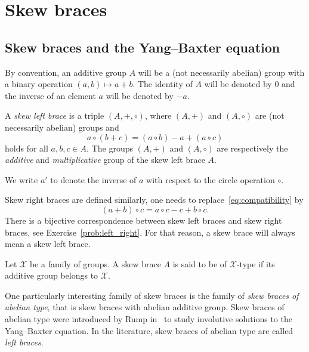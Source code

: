 \chapter{Skew braces}
\label{braces}

\section*{Skew braces and the Yang--Baxter equation}

By convention, an additive group $A$ will be a (not necessarily abelian) group 
with a binary operation $(a,b)\mapsto a+b$. The 
identity of $A$ will be denoted by $0$ and the inverse of an element $a$ will be denoted by $-a$. 

\begin{definition}
    \label{def:brace}
	A \emph{skew left brace} is a triple $(A,+,\circ)$, where $(A,+)$ and $(A,\circ)$ 
	are (not necessarily abelian) 
	groups and 
	\begin{equation}
	    \label{eq:compatibility}
	    a\circ(b+c)=(a\circ b)-a+(a\circ c)
	\end{equation}
	holds for all $a,b,c\in A$. The groups 
	$(A,+)$ and $(A,\circ)$ are respectively 
	the \emph{additive} and \emph{multiplicative} group
	of the skew left brace $A$.
\end{definition}

We write $a'$ to denote the inverse of $a$ with respect to the circle operation $\circ$. 

Skew right braces are defined similarly, one needs 
to replace~\eqref{eq:compatibility} by 
\[
(a+b)\circ c=a\circ c-c+b\circ c.
\]
There is a bijective correspondence between skew left braces and skew right braces, 
see Exercise~\ref{prob:left_right}. For that reason, 
a skew brace will always mean a skew left brace. 

\begin{definition}
    Let $\mathcal{X}$ be a family of groups. A skew brace $A$ is said to be
    of $\mathcal{X}$-type if its additive group belongs to $\mathcal{X}$.
\end{definition}

One particularly interesting family of skew braces is the family of \emph{skew braces of abelian type}, 
that is skew braces with abelian additive group. 
Skew braces of abelian type were introduced by Rump in~\cite{MR2278047} to study involutive solutions to the Yang--Baxter equation. 
In the literature, skew braces of abelian type are called \emph{left braces}. 

